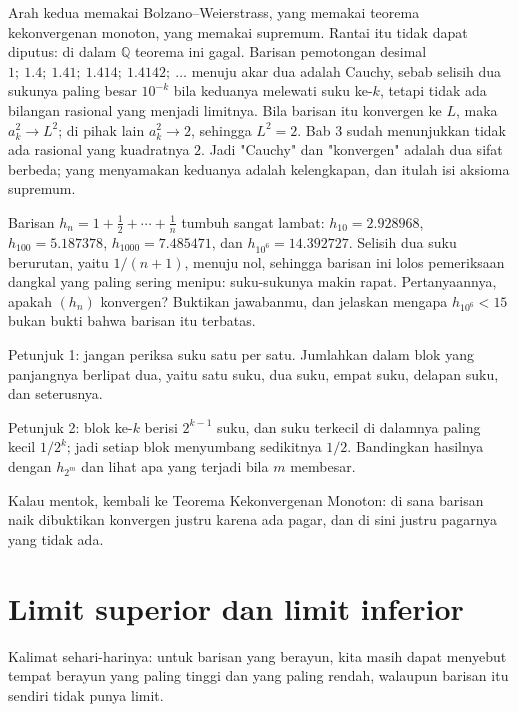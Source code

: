 Arah kedua memakai Bolzano--Weierstrass, yang memakai teorema kekonvergenan
monoton, yang memakai supremum. Rantai itu tidak dapat diputus: di dalam
$\mathbb{Q}$ teorema ini gagal. Barisan pemotongan desimal
$1;\ 1.4;\ 1.41;\ 1.414;\ 1.4142;\ \dots$ menuju akar dua adalah Cauchy, sebab
selisih dua sukunya paling besar $10^{-k}$ bila keduanya melewati suku ke-$k$,
tetapi tidak ada bilangan rasional yang menjadi limitnya. Bila barisan itu
konvergen ke $L$, maka $a_k^2 \to L^2$; di pihak lain $a_k^2 \to 2$, sehingga
$L^2=2$. Bab 3 sudah menunjukkan tidak ada rasional yang kuadratnya $2$. Jadi
"Cauchy" dan "konvergen" adalah dua sifat berbeda; yang menyamakan keduanya adalah
kelengkapan, dan itulah isi aksioma supremum.

\begin{tantangan}
Barisan $h_n=1+\frac12+\cdots+\frac1n$ tumbuh sangat lambat: $h_{10}=2.928968$,
$h_{100}=5.187378$, $h_{1000}=7.485471$, dan $h_{10^6}=14.392727$. Selisih dua suku
berurutan, yaitu $1/(n+1)$, menuju nol, sehingga barisan ini lolos pemeriksaan
dangkal yang paling sering menipu: suku-sukunya makin rapat. Pertanyaannya, apakah
$(h_n)$ konvergen? Buktikan jawabanmu, dan jelaskan mengapa $h_{10^6}<15$ bukan
bukti bahwa barisan itu terbatas.

Petunjuk 1: jangan periksa suku satu per satu. Jumlahkan dalam blok yang panjangnya
berlipat dua, yaitu satu suku, dua suku, empat suku, delapan suku, dan seterusnya.

Petunjuk 2: blok ke-$k$ berisi $2^{k-1}$ suku, dan suku terkecil di dalamnya paling
kecil $1/2^k$; jadi setiap blok menyumbang sedikitnya $1/2$. Bandingkan hasilnya
dengan $h_{2^m}$ dan lihat apa yang terjadi bila $m$ membesar.

Kalau mentok, kembali ke Teorema Kekonvergenan Monoton: di sana barisan naik
dibuktikan konvergen justru karena ada pagar, dan di sini justru pagarnya yang
tidak ada.
\end{tantangan}

\section{Limit superior dan limit inferior}

Kalimat sehari-harinya: untuk barisan yang berayun, kita masih dapat menyebut
tempat berayun yang paling tinggi dan yang paling rendah, walaupun barisan itu
sendiri tidak punya limit.


